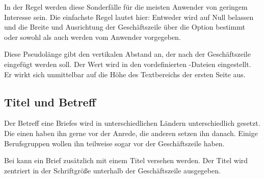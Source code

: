 In der Regel werden diese Sonderfälle für die %
\iffalse%
häufigsten Anwendungen %
\else %
meisten Anwender %
\fi %
von geringem Interesse sein. Die einfachste Regel lautet hier:
Entweder wird  auf Null belassen und die Breite und
Ausrichtung der Geschäftszeile über die Option
 bestimmt oder sowohl  als
auch  werden vom Anwender vorgegeben.%
\EndIndexGroup


\begin{Declaration}
\end{Declaration}
Diese Pseudolänge gibt den vertikalen Abstand an, der nach der Geschäftszeile
eingefügt werden soll. Der Wert wird in den vordefinierten
-Dateien
eingestellt. Er wirkt sich unmittelbar auf die Höhe des Textbereichs der
ersten Seite aus.%
\iffalse %
\ Der typische Wert liegt zwischen einer und zwei Zeilen.%
\fi %
\EndIndexGroup
%
\EndIndexGroup


\subsection{Titel und Betreff}
%
\BeginIndexGroup
{}

Der Betreff eine Briefes wird in unterschiedlichen Ländern unterschiedlich
gesetzt. Die einen haben ihn gerne vor der Anrede, die anderen setzen ihn
danach. Einige Berufsgruppen wollen ihn teilweise sogar vor der Geschäftszeile
haben.


\begin{Declaration}
\end{Declaration}
Bei \KOMAScript{} kann ein Brief zusätzlich mit einem Titel
versehen werden. Der Titel wird zentriert in der Schriftgröße 
unterhalb der Geschäftszeile ausgegeben.

